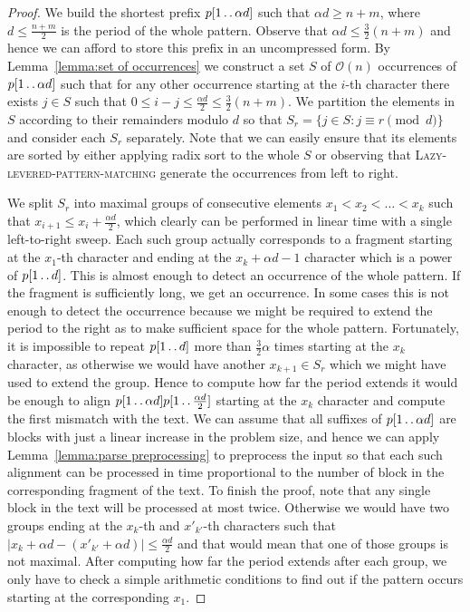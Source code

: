 \documentclass[runningheads]{llncs}
\newcommand{\twodots}{\mathinner{\ldotp\ldotp}}
\newcommand{\proc}[1]{\textnormal{\scshape#1}}
\begin{document}
\begin{proof}
We build the shortest prefix $p[1\twodots\alpha d]$ such that $\alpha d\geq n+m$, where $d\leq\frac{n+m}{2}$ is the period of the whole pattern. Observe that $\alpha d\leq \frac{3}{2}(n+m)$ and hence we can afford to store this prefix in an uncompressed form. By Lemma~\ref{lemma:set of occurrences} we construct a set $S$ of $\mathcal{O}(n)$ occurrences of $p[1\twodots\alpha d]$ such that for
any other occurrence starting at the $i$-th character there exists $j\in S$ such that $0\leq i-j\leq\frac{\alpha d}{2}\leq \frac{3}{2}(n+m)$. We partition the elements in $S$ according to their remainders modulo $d$ so that $S_{r}=\{j\in S: j\equiv r \pmod d\}$ and consider each $S_{r}$ separately. Note that we can easily ensure that its elements are sorted by either applying radix sort to the whole $S$ or observing that \proc{Lazy-levered-pattern-matching} generate the occurrences from left to right.


We split $S_{r}$ into maximal groups of consecutive elements $x_{1}<x_{2}<\ldots <x_{k}$ such that $x_{i+1}\leq x_{i}+\frac{\alpha d}{2}$, which clearly can be performed in linear time with a single left-to-right sweep. Each such group actually corresponds to a fragment starting at the $x_{1}$-th character and ending at the $x_{k}+\alpha d-1$ character which is a power of $p[1\twodots d]$. This is almost enough to detect an occurrence of the whole pattern. If the fragment is sufficiently long, we get an occurrence. In some cases this is not enough to detect the occurrence because we might be required to extend the period to the right as to make sufficient space for the whole pattern. Fortunately, it is impossible to repeat $p[1\twodots d]$ more than $\frac{3}{2}\alpha$ times starting at the $x_{k}$ character, as otherwise we would have another $x_{k+1}\in S_{r}$ which we might have used to extend the group. Hence to compute how far the period extends it would be enough to align $p[1\twodots\alpha d]p[1\twodots\frac{\alpha d}{2}]$ starting at the $x_{k}$ character and compute the first mismatch with the text. We can assume that all suffixes of $p[1\twodots\alpha d]$ are blocks with just a linear increase in the problem size, and hence we can apply Lemma~\ref{lemma:parse preprocessing} to preprocess the input so that each such alignment can be processed in time proportional to the number of block in the corresponding fragment of the text. To finish the proof, note that any single block in the text will be processed at most twice. Otherwise we would have two groups ending at the $x_{k}$-th and $x'_{k'}$-th characters such that $\left|x_{k}+\alpha d - (x'_{k'}+\alpha d)\right|\leq\frac{\alpha d}{2}$ and that would mean that one of those groups is not maximal. After computing how far the period extends after each group, we only have to check a simple arithmetic conditions to find out if the pattern occurs starting at the corresponding $x_{1}$.


\end{proof}
\end{document}
